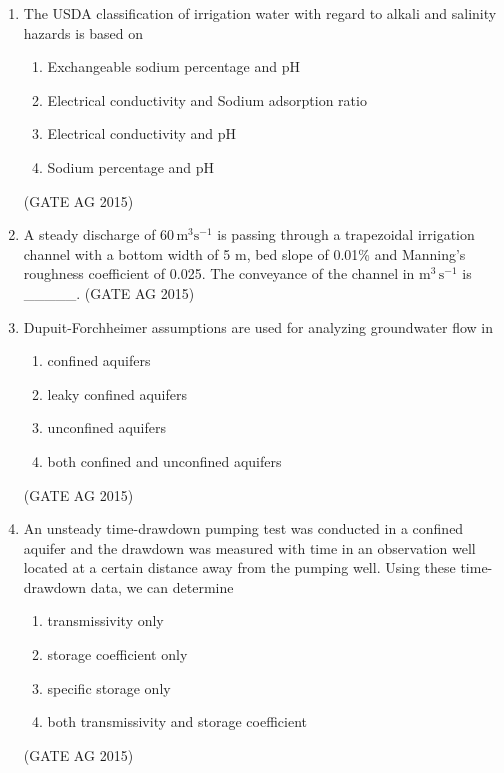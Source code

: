 \documentclass[journal,12pt,onecolumn]{IEEEtran}
\theoremstyle{remark}
\begin{document}
\begin{enumerate}
\item The USDA classification of irrigation water with regard to alkali and salinity hazards is based on  
\begin{enumerate}
    \item Exchangeable sodium percentage and pH
    \item Electrical conductivity and Sodium adsorption ratio
    \item Electrical conductivity and pH
    \item Sodium percentage and pH
\end{enumerate}
\hfill{(GATE AG 2015)}

\item A steady discharge of $60 \, \text{m}^3 \text{s}^{-1}$ is passing through a trapezoidal irrigation channel with a bottom width of 5 m, bed slope of 0.01\% and Manning's roughness coefficient of 0.025. The conveyance of the channel in $\text{m}^3 \, \text{s}^{-1}$ is \_\_\_\_\_.  
\hfill{(GATE AG 2015)}

\item Dupuit-Forchheimer assumptions are used for analyzing groundwater flow in  
\begin{multicols}{4}
\begin{enumerate}
    \item confined aquifers
    \item leaky confined aquifers
    \item unconfined aquifers
    \item both confined and unconfined aquifers
\end{enumerate}
\end{multicols}
\hfill{(GATE AG 2015)}

\item An unsteady time-drawdown pumping test was conducted in a confined aquifer and the drawdown was measured with time in an observation well located at a certain distance away from the pumping well. Using these time-drawdown data, we can determine
\begin{multicols}{2}
\begin{enumerate}
    \item transmissivity only
    \item storage coefficient only
    \item specific storage only
    \item both transmissivity and storage coefficient
\end{enumerate}
\end{multicols}
\hfill{(GATE AG 2015)}


\end{enumerate}
\end{document}
